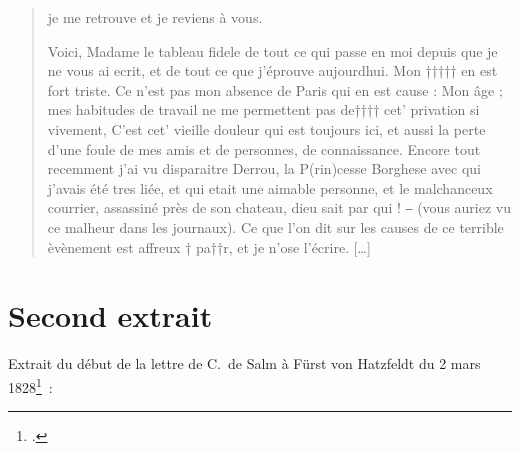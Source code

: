 \documentclass[a4paper,12pt,twoside]{book}
\begin{document}
\begin{quotation}
				je me retrouve et je reviens à vous.
							
				Voici, Madame le tableau fidele de tout ce qui
				passe en moi depuis que je ne vous ai ecrit, et de
				tout ce que j'éprouve aujourdhui. Mon ††††† en est fort
				triste. Ce n'est pas mon absence de Paris qui en est cause :
				Mon âge ; mes habitudes de travail ne me permettent pas
				de†††† cet' privation si vivement, C'est cet' vieille
				douleur qui est toujours ici, et aussi la perte d'une
				foule de mes amis et de personnes, de connaissance.
				Encore tout recemment j'ai vu disparaitre Derrou,
				la P(rin)cesse Borghese avec qui j'avais été tres liée, et qui
				etait une aimable personne, et le malchanceux courrier, assassiné
				près de son chateau, dieu sait par qui ! ‒ (vous auriez vu ce malheur
				dans les journaux). Ce que l'on dit sur les causes de ce terrible
				èvènement est affreux † pa††r, et je n'ose l'écrire. […]			
			\end{quotation}
	
		\clearpage
		\section{Second extrait}
			\label{trans-C11S92047049}
			Extrait du début de la lettre de C.~de Salm à Fürst von Hatzfeldt du 2 mars 1828\footcite{C11S92047049}~:
			
\end{document}
